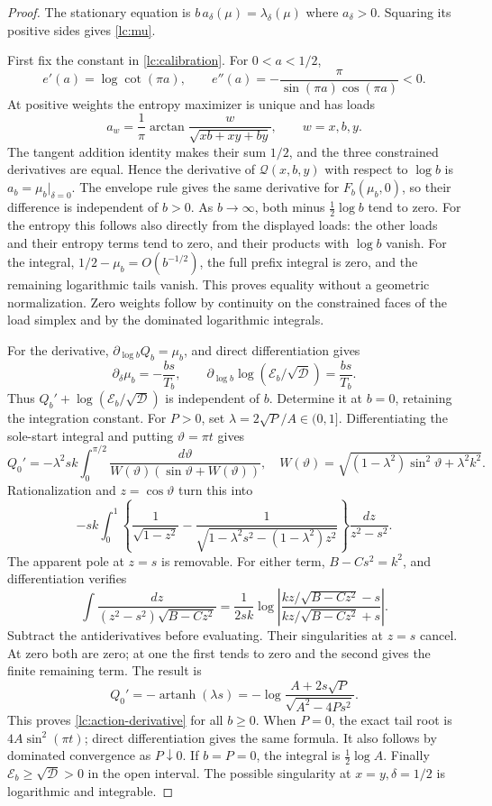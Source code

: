 \documentclass[11pt]{article}
\numberwithin{equation}{section}
\theoremstyle{remark}\newtheorem{remark}[theorem]{Remark}
\begin{document}
\begin{proof}
The stationary equation is
\(b\,a_\delta(\mu)=\lambda_\delta(\mu)\) where \(a_\delta>0\).
Squaring its positive sides gives \eqref{lc:mu}.

First fix the constant in \eqref{lc:calibration}. For \(0<a<1/2\),
\[
 e'(a)=\log\cot(\pi a),\qquad
 e''(a)=-\frac{\pi}{\sin(\pi a)\cos(\pi a)}<0.
\]
At positive weights the entropy maximizer is unique and has loads
\[
 a_w=\frac1\pi\arctan\frac{w}{\sqrt{xb+xy+by}},
                          \qquad w=x,b,y .
\]
The tangent addition identity makes their sum \(1/2\), and the
three constrained derivatives are equal. Hence the derivative
of \(\mathcal Q(x,b,y)\) with respect to \(\log b\) is
\(a_b=\mu_b|_{\delta=0}\). The envelope rule gives the same
derivative for \(F_b(\mu_b,0)\), so their difference is independent
of \(b>0\). As \(b\to\infty\), both minus \(\frac12\log b\)
tend to zero. For the entropy this follows also directly from the
displayed loads: the other loads and their entropy terms tend to zero,
and their products with \(\log b\) vanish. For the integral,
\(1/2-\mu_b=O(b^{-1/2})\), the full prefix integral is zero,
and the remaining logarithmic tails vanish.
This proves equality without a geometric normalization.
Zero weights follow by continuity on the constrained faces of
the load simplex and by the dominated logarithmic integrals.

For the derivative, \(\partial_{\log b}Q_b=\mu_b\), and
direct differentiation gives
\[
 \partial_\delta\mu_b=-\frac{bs}{T_b},\qquad
 \partial_{\log b}\log(\mathcal E_b/\sqrt{\mathcal D})
                                      =\frac{bs}{T_b}.
\]
Thus \(Q_b'+\log(\mathcal E_b/\sqrt{\mathcal D})\) is independent
of \(b\). Determine it at \(b=0\), retaining the integration constant.
For \(P>0\), set \(\lambda=2\sqrt P/A\in(0,1]\).
Differentiating the sole-start integral and putting
\(\vartheta=\pi t\) gives
\[
 Q_0'=-\lambda^2sk\int_0^{\pi/2}
 \frac{d\vartheta}{W(\vartheta)(\sin\vartheta+W(\vartheta))},
 \quad W(\vartheta)=
       \sqrt{(1-\lambda^2)\sin^2\vartheta+\lambda^2k^2}.
\]
Rationalization and \(z=\cos\vartheta\) turn this into
\[
 -sk\int_0^1\left\{\frac1{\sqrt{1-z^2}}-
 \frac1{\sqrt{1-\lambda^2s^2-(1-\lambda^2)z^2}}\right\}
                                  \frac{dz}{z^2-s^2}.
\]
The apparent pole at \(z=s\) is removable. For either term,
\(B-Cs^2=k^2\), and differentiation verifies
\[
 \int\frac{dz}{(z^2-s^2)\sqrt{B-Cz^2}}
 =\frac1{2sk}\log\left|
     \frac{kz/\sqrt{B-Cz^2}-s}{kz/\sqrt{B-Cz^2}+s}\right|.
\]
Subtract the antiderivatives before evaluating. Their singularities
at \(z=s\) cancel. At zero both are zero; at one the first tends to
zero and the second gives the finite remaining term. The result is
\[
 Q_0'=-\operatorname{artanh}(\lambda s)
 =-\log\frac{A+2s\sqrt P}{\sqrt{A^2-4Ps^2}} .
\]
This proves \eqref{lc:action-derivative} for all \(b\ge0\).
When \(P=0\), the exact tail root is \(4A\sin^2(\pi t)\);
direct differentiation gives the same formula. It also follows by
dominated convergence as \(P\downarrow0\).
If \(b=P=0\), the integral is \(\frac12\log A\).
Finally \(\mathcal E_b\ge\sqrt{\mathcal D}>0\) in the open interval.
The possible singularity at \(x=y,\delta=1/2\) is logarithmic and
integrable.
\end{proof}
\end{document}
